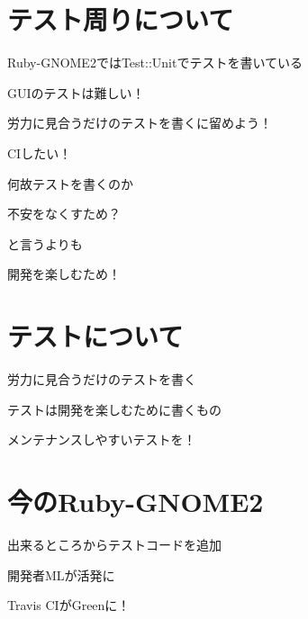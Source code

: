 \section{テスト周りについて}
\begin{frame}
\begin{itemize}
{\huge
\item{} Ruby-GNOME2ではTest::Unitでテストを書いている
\item{} GUIのテストは難しい！
\item{} 労力に見合うだけのテストを書くに留めよう！
\item{} CIしたい！
}
\end{itemize}
\end{frame}

\begin{frame}
\begin{center}
{\Huge
\item 何故テストを書くのか
}
\end{center}
\end{frame}

\begin{frame}
\begin{center}
{\Huge
\item 不安をなくすため？
}
\end{center}
\end{frame}

\begin{frame}
\begin{center}
{\Huge
\item と言うよりも
}
\end{center}
\end{frame}

\begin{frame}
\begin{center}
{\Huge
\item 開発を楽しむため！
}
\end{center}
\end{frame}

\section{テストについて}

\begin{frame}
\begin{itemize}
{\huge
\item{} 労力に見合うだけのテストを書く
\item{} テストは開発を楽しむために書くもの
\item{} メンテナンスしやすいテストを！
}
\end{itemize}
\end{frame}

\section{今のRuby-GNOME2}
\begin{frame}
\begin{itemize}
{\huge
\item 出来るところからテストコードを追加
\item 開発者MLが活発に
\item Travis CIがGreenに！
}
\end{itemize}
\end{frame}
